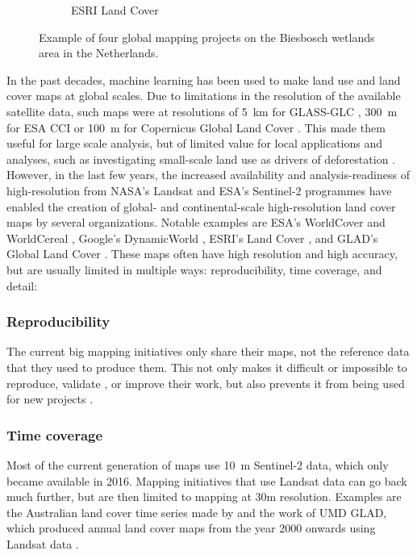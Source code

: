 \begin{figure}[H]
\begin{subfigure}[b]{0.48\textwidth}
    \caption{ESRI Land Cover}
    \label{fig:lc_esri}
    \end{subfigure}
    \caption{Example of four global mapping projects on the Biesbosch wetlands area in the Netherlands.}
    \label{fig:bigmaps_biesbosch}
    \end{figure}

    In the past decades, machine learning has been used to make land use and land cover maps at global scales. Due to limitations in the resolution of the available satellite data, such maps were at resolutions of 5~km for GLASS-GLC \citep{liu2020annual}, 300~m for ESA CCI \citep{defourny2012land} or 100~m for Copernicus Global Land Cover \citep{buchhorn2020copernicus}. This made them useful for large scale analysis, but of limited value for local applications and analyses, such as investigating small-scale land use as drivers of deforestation \citep{masolele2024mapping}. However, in the last few years, the increased availability and analysis-readiness of high-resolution from NASA's Landsat and ESA's Sentinel-2 programmes have enabled the creation of global- and continental-scale high-resolution land cover maps by several organizations. Notable examples are ESA's WorldCover \citep{kerchove2021esa} and WorldCereal \citep{tricht2023worldcereal}, Google's DynamicWorld \citep{brown2022dynamic}, ESRI's Land Cover \citep{karra2021global}, and GLAD's Global Land Cover \citep{potapov2022global}.
    These maps often have high resolution and high accuracy, but are usually limited in multiple ways: reproducibility, time coverage, and detail:
    
    \subsubsection{Reproducibility}
        The current big mapping initiatives only share their maps, not the reference data that they used to produce them. This not only makes it difficult or impossible to reproduce, validate \citep{venter2022global}, or improve their work, but also prevents it from being used for new projects \citep{tsendbazar2015assessing}.
    
    \subsubsection{Time coverage} 
        Most of the current generation of maps use 10~m Sentinel-2 data, which only became available in 2016. Mapping initiatives that use Landsat data can go back much further, but are then limited to mapping at 30m resolution. Examples are the Australian land cover time series made by \citep{calderon2021high} and the work of UMD GLAD, which produced annual land cover maps from the year 2000 onwards using Landsat data \citep{hansen2022global}. 

